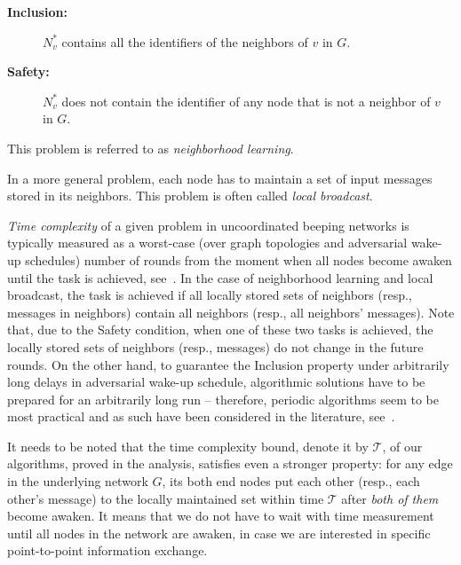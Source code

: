 \documentclass[11pt]{article}
\begin{document}
\vspace*{-1ex}
\begin{description}
    \item[\textbf{Inclusion:}] $N^*_v$ contains all the identifiers of the neighbors of $v$ in $G$.
\vspace*{-1ex}
    \item[\textbf{Safety:}] $N^*_v$  does not contain the identifier of any node that is not a neighbor 
    of $v$ in $G$.
\end{description}

\vspace*{-1ex}
This problem is referred to as \textit{neighborhood learning}.




In a more general problem, each node has to 
maintain a set of input messages stored in its neighbors. 
This problem is often called {\em local broadcast}.

{\em Time complexity} of a given problem in uncoordinated beeping networks is typically measured as a worst-case (over graph topologies and adversarial wake-up schedules) number of rounds from the moment when all nodes become awaken until the task is achieved, see~\cite{DBB2020}. In the case of neighborhood learning and local broadcast, the task is achieved if all locally stored sets of neighbors (resp., messages in neighbors) contain all neighbors (resp., all neighbors' messages). Note that, due to the Safety condition, when one of these two tasks is achieved, the locally stored sets of neighbors (resp., messages) do not change in the future rounds.
On the other hand, to guarantee the Inclusion property under arbitrarily long delays in adversarial wake-up schedule, algorithmic solutions have to be prepared for an arbitrarily long run -- therefore, periodic algorithms seem to be most practical and as such have been considered in the literature, see~\cite{DBB2020}.

It needs to be noted that the time complexity bound, denote it by $\mathcal{T}$, of our algorithms, proved in the analysis, satisfies even a stronger property: for any edge in the underlying network $G$, its both end nodes put each other (resp., each other's message) to the locally maintained set within time $\mathcal{T}$ after {\em both of them} become awaken. It means that we do not have to wait with time measurement until all nodes in the network are awaken, in case we are interested in specific point-to-point information exchange.
\end{document}
